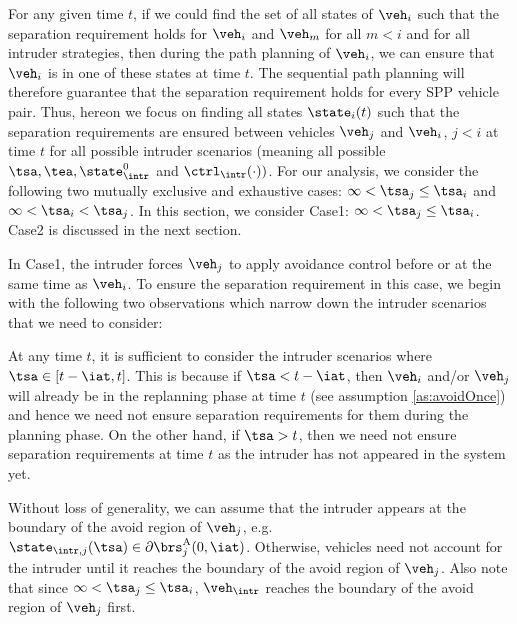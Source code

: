 For any given time $t$, if we could find the set of all states of $\veh_i$ such that the separation requirement holds for $\veh_i$ and $\veh_m$ for all $m<i$ and for all intruder strategies, then during the path planning of $\veh_i$, we can ensure that $\veh_i$ is in one of these states at time $t$. The sequential path planning will therefore guarantee that the separation requirement holds for every SPP vehicle pair. Thus, hereon we focus on finding all states $\state_i(t)$ such that the separation requirements are ensured between vehicles $\veh_j$ and $\veh_i$, $j <i$ at time $t$ for all possible intruder scenarios (meaning all possible $\tsa, \tea, \state_{\intr}^0$ and $\ctrl_{\intr}(\cdot))$. For our analysis, we consider the following two mutually exclusive and exhaustive cases: $\infty < \tsa_j \leq \tsa_i$ and $\infty < \tsa_i < \tsa_j$. %
In this section, we consider Case1: $\infty < \tsa_j \leq \tsa_i$. Case2 is discussed in the next section.  

In Case1, the intruder forces $\veh_j$ to apply avoidance control before or at the same time as $\veh_i$. %
To ensure the separation requirement in this case, we begin with the following two observations which narrow down the intruder scenarios that we need to consider:

\begin{observation} \label{obs1_case1}
At any time $t$, it is sufficient to consider the intruder scenarios where $\tsa \in [t-\iat, t]$. This is because if $\tsa < t - \iat$, then $\veh_i$ and/or $\veh_j$ will already be in the replanning phase at time $t$ (see assumption \ref{as:avoidOnce}) and hence we need not ensure separation requirements for them during the planning phase. On the other hand, if $\tsa > t$, then we need not ensure separation requirements at time $t$ as the intruder has not appeared in the system yet. %
\end{observation}

\begin{observation} \label{obs2_case1}
Without loss of generality, we can assume that the intruder appears at the boundary of the avoid region of $\veh_j$, e.g. $\state_{\intr, j}(\tsa) \in \partial \brs^{\text{A}}_{j}(0, \iat)$. Otherwise, vehicles need not account for the intruder until it reaches the boundary of the avoid region of $\veh_j$. Also note that since $\infty < \tsa_j \leq \tsa_i$, $\veh_{\intr}$ reaches the boundary of the avoid region of $\veh_j$ first. 
\end{observation}